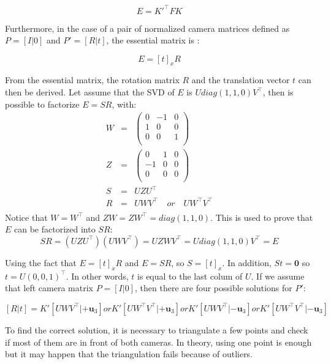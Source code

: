 \documentclass[12pt]{article}
\begin{document}
\[
	E = K'^\top FK
\]

Furthermore, in the case of a pair of normalized camera matrices defined as $P =[I|0]$ and $P'=[R|t]$, the essential matrix is :

\[
    E = [t]_x R
\]

From the essential matrix, the rotation matrix $R$ and the translation vector $t$ can then be derived. Let assume that the SVD of $E$ is $Udiag(1, 1, 0)V^\top$, then is possible to factorize $E = SR$, with:
\[
\left .
  \begin{array}{ccl}
        W & = & \left (
                \begin{matrix}
	                0 & -1 & 0 \\
	                1 & 0 & 0 \\
	                0 & 0 & 1 \\
                \end{matrix}
                \right ) \\
        Z & = & \left (
                \begin{matrix}
	                0 & 1 & 0\\
	                -1 & 0 & 0\\
	                0 & 0 & 0 \\
                \end{matrix}
                \right ) \\
        S & = & UZU^\top \\
        R & = & UWV^\top \quad or\quad UW^\top V^\top \\
  \end{array}
\right.
\]
Notice that $W = W^\top$ and $ZW = ZW^\top = diag(1, 1, 0)$. This is used to prove that $E$ can be factorized into $SR$: 
\[
    SR = (UZU^\top)(UWV^\top) = UZWV^\top = Udiag(1, 1, 0)V^\top = E
\]

Using the fact that $E =[t]_x R$ and $E = SR$, so $S=[t]_x$. In addition, $St = \mathbf{0}$ so $t = U(0, 0, 1)^\top$. In other words, $t$ is equal to the last colum of $U$. If we assume that left camera matrix $P = [I|0]$, then there are four possible solutions for $P'$:

\[
    [R|t] = K'[UWV^\top | +\mathbf{u}_3] or K'[UW^\top V^\top | +\mathbf{u}_3] or K'[UWV^\top | -\mathbf{u}_3] or  K'[UW^\top V^\top | -\mathbf{u}_3]
\]

To find the correct solution, it is necessary to triangulate a few points and check if most of them are in front of both cameras. In theory, using one point is enough but it may happen that the triangulation fails because of outliers.
\end{document}

